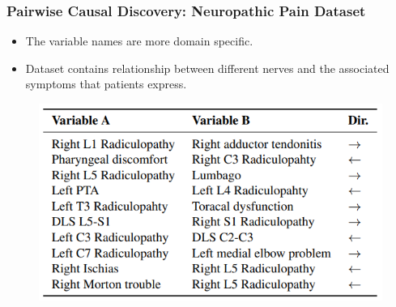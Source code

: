 \documentclass{beamer}
\begin{document}
\begin{frame}
	\frametitle{Pairwise Causal Discovery: Neuropathic Pain Dataset}
	\begin{itemize}
		\item The variable names are more domain specific.
		\item Dataset contains relationship between different nerves and the associated symptoms that patients express.
	\end{itemize}
	\begin{figure}
		\centering
		\includegraphics[scale=0.6]{imgs/table3.png}
	\end{figure}
\end{frame}
\end{document}
